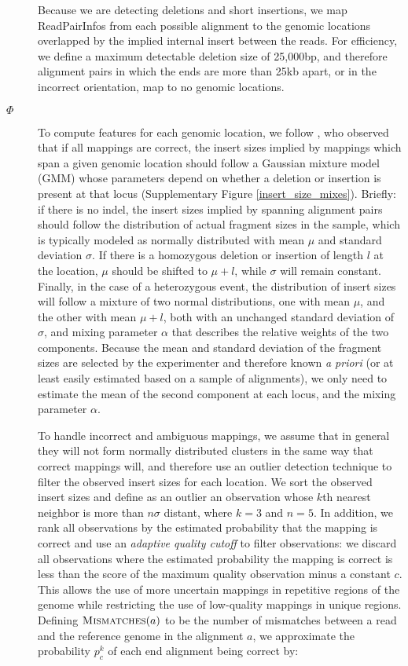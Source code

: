 \documentclass [11pt] {report}
\begin{document}
\begin{description}
\item[] Because we are detecting deletions and short insertions, we map ReadPairInfos from each possible alignment to the genomic locations overlapped by the implied internal insert between the reads. For efficiency, we define a maximum detectable deletion size of 25,000bp, and therefore alignment pairs in which the ends are more than 25kb apart, or in the incorrect orientation, map to no genomic locations.
\item[$\Phi$] To compute features for each genomic location, we follow \cite{Lee:2009da}, who observed that if all mappings are correct, the insert sizes implied by mappings which span a given genomic location should follow a Gaussian mixture model (GMM) whose parameters depend on whether a deletion or insertion is present at that locus (Supplementary Figure \ref{insert_size_mixes}). Briefly: if there is no indel, the insert sizes implied by spanning alignment pairs should follow the distribution of actual fragment sizes in the sample, which is typically modeled as normally distributed with mean $\mu$ and standard deviation $\sigma$. If there is a homozygous deletion or insertion of length $l$ at the location, $\mu$ should be shifted to $\mu + l$, while $\sigma$ will remain constant. Finally, in the case of a heterozygous event, the distribution of insert sizes will follow a mixture of two normal distributions, one with mean $\mu$, and the other with mean $\mu + l$, both with an unchanged standard deviation of $\sigma$, and mixing parameter $\alpha$ that describes the relative weights of the two components. Because the mean and standard deviation of the fragment sizes are selected by the experimenter and therefore known \emph{a priori} (or at least easily estimated based on a sample of alignments), we only need to estimate the mean of the second component at each locus, and the mixing parameter $\alpha$.

To handle incorrect and ambiguous mappings, we assume that in general they will not form normally distributed clusters in the same way that correct mappings will, and therefore use an outlier detection technique to filter the observed insert sizes for each location. We sort the observed insert sizes and define as an outlier an observation whose $k$th nearest neighbor is more than $n\sigma$ distant, where $k = 3$ and $n = 5$. In addition, we rank all observations by the estimated probability that the mapping is correct and use an \emph{adaptive quality cutoff} to filter observations: we discard all observations where the estimated probability the mapping is correct is less than the score of the maximum quality observation minus a constant $c$. This allows the use of more uncertain mappings in repetitive regions of the genome while restricting the use of low-quality mappings in unique regions. Defining $\textsc{Mismatches}(a)$ to be the number of mismatches between a read and the reference genome in the alignment $a$, we approximate the probability $p^{k}_c$ of each end alignment being correct by:


\end{description}
\end{document}
